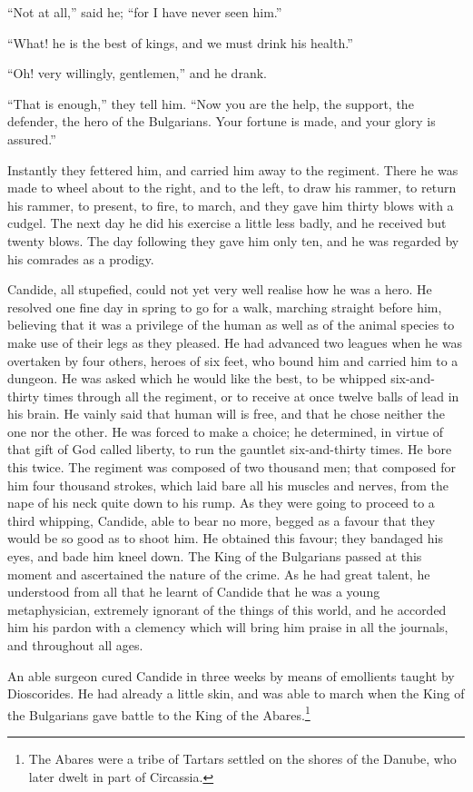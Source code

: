 ``Not at all,'' said he; ``for I have never seen him.''

``What! he is the best of kings, and we must drink his health.''

``Oh! very willingly, gentlemen,'' and he drank.

``That is enough,'' they tell him. ``Now you are the help, the support, the defender, the hero of the Bulgarians. Your fortune is made, and your glory is assured.''

Instantly they fettered him, and carried him away to the regiment. There he was made to wheel about to the right, and to the left, to draw his rammer, to return his rammer, to present, to fire, to march, and they gave him thirty blows with a cudgel. The next day he did his exercise a little less badly, and he received but twenty blows. The day following they gave him only ten, and he was regarded by his comrades as a prodigy.

Candide, all stupefied, could not yet very well realise how he was a hero. He resolved one fine day in spring to go for a walk, marching straight before him, believing that it was a privilege of the human as well as of the animal species to make use of their legs as they pleased. He had advanced two leagues when he was overtaken by four others, heroes of six feet, who bound him and carried him to a dungeon. He was asked which he would like the best, to be whipped six-and-thirty times through all the regiment, or to receive at once twelve balls of lead in his brain. He vainly said that human will is free, and that he chose neither the one nor the other. He was forced to make a choice; he determined, in virtue of that gift of God called liberty, to run the gauntlet six-and-thirty times. He bore this twice. The regiment was composed of two thousand men; that composed for him four thousand strokes, which laid bare all his muscles and nerves, from the nape of his neck quite down to his rump. As they were going to proceed to a third whipping, Candide, able to bear no more, begged as a favour that they would be so good as to shoot him. He obtained this favour; they bandaged his eyes, and bade him kneel down. The King of the Bulgarians passed at this moment and ascertained the nature of the crime. As he had great talent, he understood from all that he learnt of Candide that he was a young metaphysician, extremely ignorant of the things of this world, and he accorded him his pardon with a clemency which will bring him praise in all the journals, and throughout all ages.

An able surgeon cured Candide in three weeks by means of emollients taught by Dioscorides. He had already a little skin, and was able to march when the King of the Bulgarians gave battle to the King of the Abares.\footnote{The Abares were a tribe of Tartars settled on the shores of the Danube, who later dwelt in part of Circassia.}

